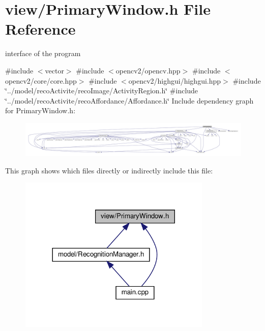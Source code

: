 \section{view/\+Primary\+Window.h File Reference}
\label{_primary_window_8h}


interface of the program  


{\ttfamily \#include $<$vector$>$}\newline
{\ttfamily \#include $<$opencv2/opencv.\+hpp$>$}\newline
{\ttfamily \#include $<$opencv2/core/core.\+hpp$>$}\newline
{\ttfamily \#include $<$opencv2/highgui/highgui.\+hpp$>$}\newline
{\ttfamily \#include \char`\"{}../model/reco\+Activite/reco\+Image/\+Activity\+Region.\+h\char`\"{}}\newline
{\ttfamily \#include \char`\"{}../model/reco\+Activite/reco\+Affordance/\+Affordance.\+h\char`\"{}}\newline
Include dependency graph for Primary\+Window.\+h\+:
\nopagebreak
\begin{figure}[H]
\begin{center}
\leavevmode
\includegraphics[width=350pt]{_primary_window_8h__incl}
\end{center}
\end{figure}
This graph shows which files directly or indirectly include this file\+:
\nopagebreak
\begin{figure}[H]
\begin{center}
\leavevmode
\includegraphics[width=260pt]{_primary_window_8h__dep__incl}
\end{center}
\end{figure}
